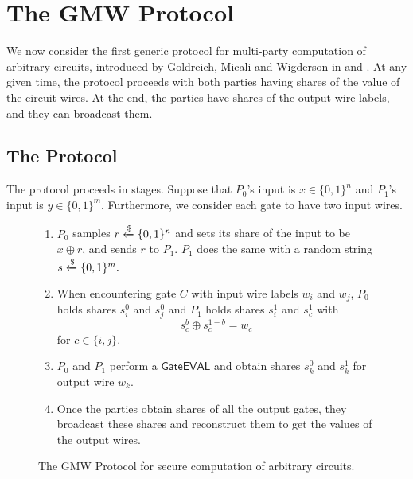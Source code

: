 \section{The GMW Protocol}

We now consider the first generic protocol for multi-party computation of arbitrary circuits, introduced by Goldreich, Micali and Wigderson in \cite{micali1987play} and \cite{goldreich2004foundations}. At any given time, the protocol proceeds with both parties having shares of the value of the circuit wires. At the end, the parties have shares of the output wire labels, and they can broadcast them.

\subsection{The Protocol}

The protocol proceeds in stages. Suppose that $P_0$'s input is $x\in\{0,1\}^n$ and $P_1$'s input is $y\in\{0,1\}^m$. Furthermore, we consider each gate to have two input wires.

\begin{figure}[h]
	\begin{mdframed}[
		linecolor=black,
		linewidth=1pt,
		roundcorner=5pt,
		backgroundcolor=white,
		userdefinedwidth=\textwidth,
		]
		\vspace{2mm}
		\begin{enumerate}
			\item $P_0$ samples $r\xleftarrow{\$}\{0,1\}^n$ and sets its share of the input to be $x\oplus r$, and sends $r$ to $P_1$. $P_1$ does the same with a random string $s\xleftarrow{\$}\{0,1\}^m.$
			\item When encountering gate $C$ with input wire labels $w_i$ and $w_j$, $P_0$ holds shares $s^0_i$ and $s^0_j$ and $P_1$ holds shares $s^1_i$ and $s^1_c$ with $$s^b_c\oplus s^{1-b}_c=w_c$$ for $c\in\{i,j\}$.
			\item $P_0$ and $P_1$ perform a $\mathsf{GateEVAL}$ and obtain shares $s^0_k$ and $s^1_k$ for output wire $w_k$.
			\item Once the parties obtain shares of all the output gates, they broadcast these shares and reconstruct them to get the values of the output wires.
		\end{enumerate}
		\vspace{2mm}
	\end{mdframed}
	\caption{The GMW Protocol for secure computation of arbitrary circuits.}
	\label{fig:GMW}
\end{figure}

